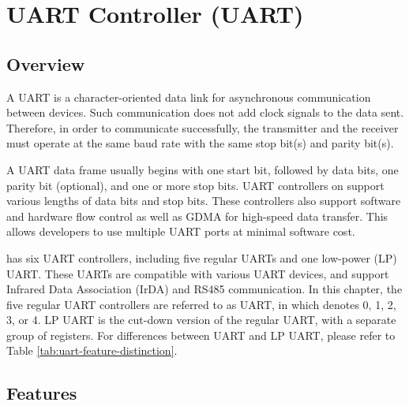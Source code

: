 \documentclass[main\_\_EN.tex]{subfiles}
\begin{document}

\ifglobal
\else
    {\let\clearpage\relax \listoftodos}
    {\let\clearpage\relax \listofdonetodos}
    \tableofcontents
\fi



\hypertarget{uart}{}
\chapter{UART Controller (UART)}
\label{mod:uart}

\section{Overview}

A UART is a character-oriented data link for asynchronous communication between devices. Such communication does not add clock signals to the data sent. Therefore, in order to communicate successfully, the transmitter and the receiver must operate at the same baud rate with the same stop bit(s) and parity bit(s).

A UART data frame usually begins with one start bit, followed by data bits, one parity bit (optional), and one or more stop bits. UART controllers on \chipname{} support various lengths of data bits and stop bits. These controllers also support software and hardware flow control as well as GDMA for high-speed data transfer. This allows developers to use multiple UART ports at minimal software cost.

\chipname{} has six UART controllers, including five regular UARTs and one low-power (LP) UART. These UARTs are compatible with various UART devices, and support Infrared Data Association (IrDA) and RS485 communication. In this chapter, the five regular UART controllers are referred to as UART, in which  denotes 0, 1, 2, 3, or 4. LP UART is the cut-down version of the regular UART, with a separate group of registers. For differences between UART and LP UART, please refer to Table \ref{tab:uart-feature-distinction}.


\section{Features}
\end{document}

